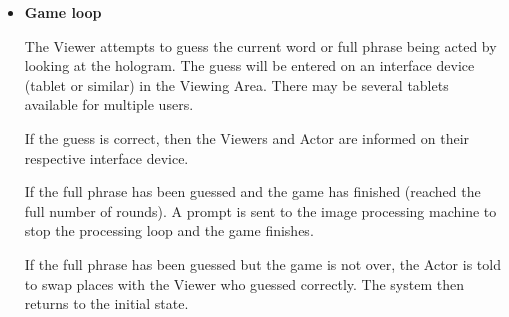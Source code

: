 \documentclass{article}
\begin{document}
\begin{itemize}
	\item \textbf{Game loop}	
	
	\subitem [B1] The Viewer attempts to guess the current word or full phrase being acted by looking at the hologram. The guess will be entered on an interface device (tablet or similar) in the Viewing Area. There may be several tablets available for multiple users.
	
	\subitem [B2] If the guess is correct, then the Viewers and Actor are informed on their respective interface device.
	
	\subitem [B3] If the full phrase has been guessed and the game has finished (reached the full number of rounds). A prompt is sent to the image processing machine to stop the processing loop and the game finishes.
	
	\subitem [B4] If the full phrase has been guessed but the game is not over, the Actor is told to swap places with the Viewer who guessed correctly. The system then returns to the initial state.
	
	
\end{itemize}
\end{document}
